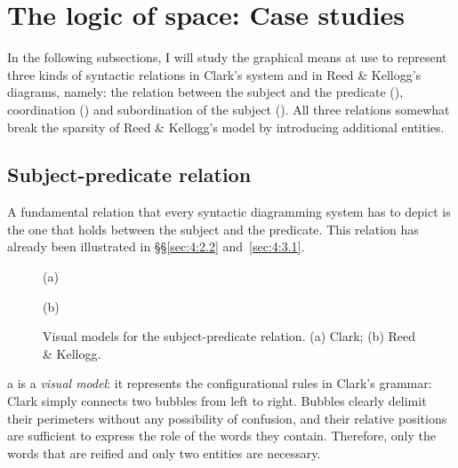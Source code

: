 \documentclass[output=paper]{langsci/langscibook}
\begin{document}
\section{The logic of space: Case studies}\label{sec:4:4}

In the following subsections, I will study the graphical means at use to represent three kinds of syntactic relations in Clark’s system and in Reed \& Kellogg’s diagrams, namely: the relation between the subject and the predicate (), coordination () and subordination of the subject (). All three relations somewhat break the sparsity of Reed \& Kellogg’s model by introducing additional entities.

\subsection{Subject-predicate relation}\label{sec:4:4.1}

A fundamental relation that every syntactic diagramming system has to depict is the one that holds between the subject and the predicate. This relation has already been illustrated in §§\ref{sec:4:2.2} and~\ref{sec:4:3.1}.

\begin{figure}
    (a) \hspace{1em} 
    \hspace{2cm}
    (b) \hspace{1em} 
    \caption{Visual models for the subject-predicate relation. (a) Clark; (b) Reed \& Kellogg.\label{fig:4:5}}
\end{figure}


a is a \textit{visual model}: it represents the configurational rules in Clark’s grammar: Clark simply connects two bubbles from left to right. Bubbles clearly delimit their perimeters without any possibility of confusion, and their relative positions are sufficient to express the role of the words they contain. Therefore, only the words that are reified and only two entities are necessary.
\end{document}
